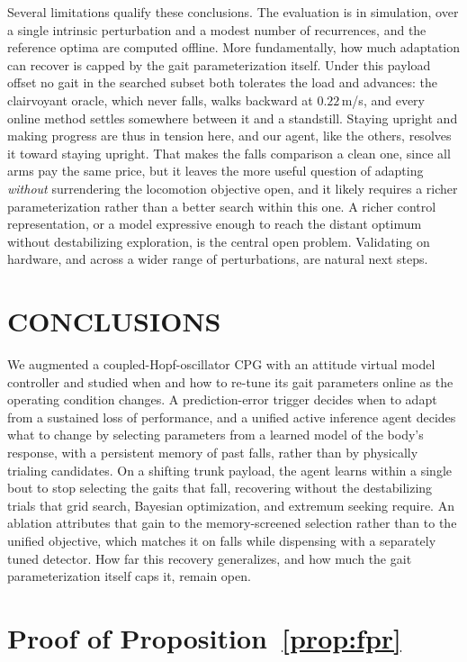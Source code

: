 \documentclass[letterpaper, 10 pt, conference]{ieeeconf}  %
\begin{document}
Several limitations qualify these conclusions.
The evaluation is in simulation, over a single intrinsic perturbation and a modest number of recurrences, and the reference optima are computed offline.
More fundamentally, how much adaptation can recover is capped by the gait parameterization itself.
Under this payload offset no gait in the searched subset both tolerates the load and advances: the clairvoyant oracle, which never falls, walks backward at $0.22$\,m/s, and every online method settles somewhere between it and a standstill.
Staying upright and making progress are thus in tension here, and our agent, like the others, resolves it toward staying upright.
That makes the falls comparison a clean one, since all arms pay the same price, but it leaves the more useful question of adapting \emph{without} surrendering the locomotion objective open, and it likely requires a richer parameterization rather than a better search within this one.
A richer control representation, or a model expressive enough to reach the distant optimum without destabilizing exploration, is the central open problem.
Validating on hardware, and across a wider range of perturbations, are natural next steps.

\section{CONCLUSIONS}

We augmented a coupled-Hopf-oscillator CPG with an attitude virtual model controller and studied when and how to re-tune its gait parameters online as the operating condition changes.
A prediction-error trigger decides when to adapt from a sustained loss of performance, and a unified active inference agent decides what to change by selecting parameters from a learned model of the body's response, with a persistent memory of past falls, rather than by physically trialing candidates.
On a shifting trunk payload, the agent learns within a single bout to stop selecting the gaits that fall, recovering without the destabilizing trials that grid search, Bayesian optimization, and extremum seeking require.
An ablation attributes that gain to the memory-screened selection rather than to the unified objective, which matches it on falls while dispensing with a separately tuned detector.
How far this recovery generalizes, and how much the gait parameterization itself caps it, remain open.


\appendix
\section{Proof of Proposition~\ref{prop:fpr}}
\label{appx:fpr}
\end{document}
